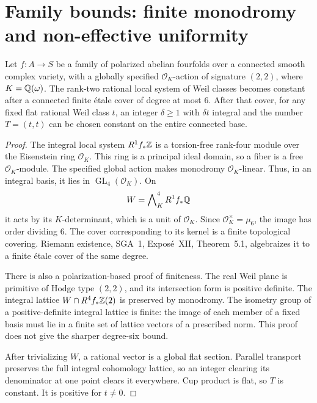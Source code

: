 \section{Family bounds: finite monodromy and non-effective uniformity}
\label{sec:family-uniform}

\begin{proposition}
Let $f:A\to S$ be a family of polarized abelian fourfolds over a connected
smooth complex variety, with a globally specified $\mathcal O_K$-action of
signature $(2,2)$, where $K=\mathbb Q(\omega)$. The rank-two rational local system
of Weil classes becomes constant after a connected finite \'etale cover of
degree at most $6$. After that cover, for any fixed flat rational Weil
class $t$, an integer $\delta\geq1$ with $\delta t$ integral and the number
$T=(t,t)$ can be chosen constant on the entire connected base.
\end{proposition}

\begin{proof}
The integral local system $R^1f_*\mathbb Z$ is a torsion-free rank-four module over
the Eisenstein ring $\mathcal O_K$. This ring is a principal ideal domain,
so a fiber is a free $\mathcal O_K$-module. The specified global action
makes monodromy $\mathcal O_K$-linear. Thus, in an integral basis, it lies
in $\operatorname{GL}_4(\mathcal O_K)$. On
\[
 W=\bigwedge\nolimits_K^4 R^1f_*\mathbb Q
\]
it acts by its $K$-determinant, which is a unit of $\mathcal O_K$. Since
$\mathcal O_K^\times=\mu_6$, the image has order dividing $6$. The cover
corresponding to its kernel is a finite topological covering. Riemann
existence, SGA~1, Expos\'e~XII, Theorem~5.1, algebraizes it to a finite
\'etale cover of the same degree.

There is also a polarization-based proof of finiteness. The real Weil
plane is primitive of Hodge type $(2,2)$, and its intersection form is
positive definite. The integral lattice
$W\cap R^4f_*\mathbb Z(2)$ is preserved by monodromy. The isometry group of a
positive-definite integral lattice is finite: the image of each member
of a fixed basis must lie in a finite set of lattice vectors of a
prescribed norm. This proof does not give the sharper degree-six bound.

After trivializing $W$, a rational vector is a global flat section.
Parallel transport preserves the full integral cohomology lattice, so
an integer clearing its denominator at one point clears it everywhere.
Cup product is flat, so $T$ is constant. It is positive for $t\ne0$.
\end{proof}

